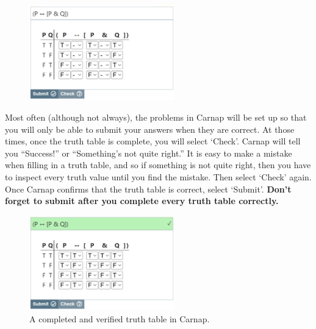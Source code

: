 \begin{figure}[b]
\centering
\includegraphics[width=6.3cm]{tt-2.png}
\caption{}
\label{fig:tt-2}
\end{figure}

Most often (although not always), the problems in Carnap will be set up so that you will only be able to submit your answers when they are correct. At those times, once the truth table is complete, you will select `Check'. Carnap will tell you ``Success!'' or ``Something's not quite right.'' It is easy to make a mistake when filling in a truth table, and so if something is not quite right, then you have to inspect every truth value until you find the mistake. Then select `Check' again. Once Carnap confirms that the truth table is correct, select `Submit'. \textbf{Don't forget to submit after you complete every truth table correctly.}

\begin{figure}[h]	%
\centering
\includegraphics[width=6.3cm]{tt-6a.png}
\caption{A completed and verified truth table in Carnap.}
\label{fig:tt-6}
\end{figure}	%







